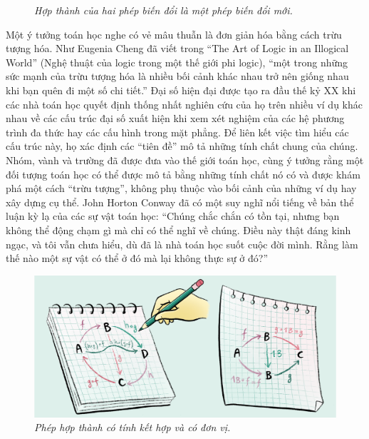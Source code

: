 \begin{multicols}{2}
\begin{figure}[H]
		\caption{\small\textit{\color{duongvaotoanhoc}Hợp thành của hai phép biến đổi là một phép biến đổi mới.}}
		\vspace*{-10pt}
	\end{figure}
	Một ý tưởng toán học nghe có vẻ mâu thuẫn là đơn giản hóa bằng cách trừu tượng hóa. Như Eugenia Cheng đã viết trong ``The Art of Logic in an Illogical World'' (Nghệ thuật của logic trong một thế giới phi logic), ``một trong những sức mạnh của trừu tượng hóa là nhiều bối cảnh khác nhau trở nên giống nhau khi bạn quên đi một số chi tiết.'' Đại số hiện đại được tạo ra đầu thế kỷ XX khi các nhà toán học quyết định thống nhất nghiên cứu của họ trên nhiều ví dụ khác nhau về các cấu trúc đại số xuất hiện khi xem xét nghiệm của các hệ phương trình đa thức hay các cấu hình trong mặt phẳng. Để liên kết việc tìm hiểu các cấu trúc này, họ xác định các ``tiên đề'' mô tả những tính chất chung của chúng. Nhóm, vành và trường đã được đưa vào thế giới toán học, cùng ý tưởng rằng một đối tượng toán học có thể được mô tả bằng những tính chất nó có và được khám phá một cách ``trừu tượng'', không phụ thuộc vào bối cảnh của những ví dụ hay xây dựng cụ thể.
	\vskip 0.1cm
	John Horton Conway đã có một suy nghĩ nổi tiếng về bản thể luận kỳ lạ của các sự vật toán học: ``Chúng chắc chắn có tồn tại, nhưng bạn không thể động chạm gì mà chỉ có thể nghĩ về chúng. Điều này thật đáng kinh ngạc, và tôi vẫn chưa hiểu, dù đã là nhà toán học suốt cuộc đời mình. Rằng làm thế nào một sự vật có thể ở đó mà lại không thực sự ở đó?''
	\begin{figure}[H]
		\centering
		\vspace*{-5pt}
		\captionsetup{labelformat= empty, justification=centering}
		\includegraphics[width=1\linewidth]{4}
		\caption{\small\textit{\color{duongvaotoanhoc}Phép hợp thành có tính kết hợp và có đơn vị.}}
		\vspace*{-10pt}
	\end{figure}

\end{multicols}
